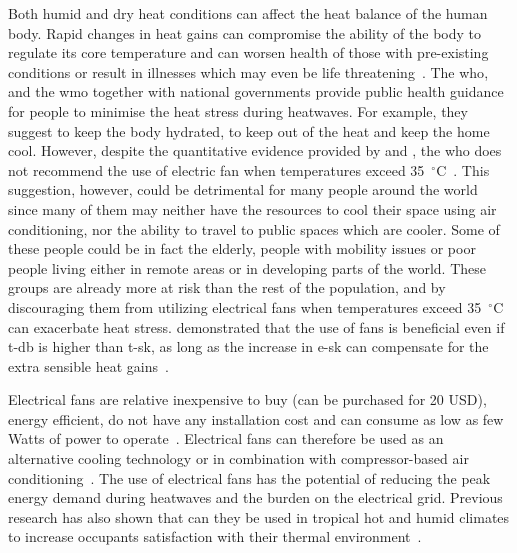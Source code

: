 Both humid and dry heat conditions can affect the heat balance of the human body.
Rapid changes in heat gains can compromise the ability of the body to regulate its core temperature and can worsen health of those with pre-existing conditions or result in illnesses which may even be life threatening~\cite{WMO2015}.
The \ac{who}, and the \ac{wmo} together with national governments provide public health guidance for people to minimise the heat stress during heatwaves.
For example, they suggest to keep the body hydrated, to keep out of the heat and keep the home cool.
However, despite the quantitative evidence provided by  and , the \ac{who} does not recommend the use of electric fan when temperatures exceed 35~$^{\circ}$C~\cite{HeatandH28:online, WMO2015}.
This suggestion, however, could be detrimental for many people around the world since many of them may neither have the resources to cool their space using air conditioning, nor the ability to travel to public spaces which are cooler.
Some of these people could be in fact the elderly, people with mobility issues or poor people living either in remote areas or in developing parts of the world.
These groups are already more at risk than the rest of the population, and by discouraging them from utilizing electrical fans when temperatures exceed 35~$^{\circ}$C can exacerbate heat stress.
 demonstrated that the use of fans is beneficial even if \ac{t-db} is higher than \ac{t-sk}, as long as the increase in \ac{e-sk} can compensate for the extra sensible heat gains~\cite{Jay2015}.

Electrical fans are relative inexpensive to buy (can be purchased for 20 USD), energy efficient, do not have any installation cost and can consume as low as few Watts of power to operate~\cite{Jay2019a, Yang2015a, Lipczynska2018a}.
Electrical fans can therefore be used as an alternative cooling technology or in combination with compressor-based air conditioning~\cite{Jay2019a, Yang2015a, Lipczynska2018a}.
The use of electrical fans has the potential of reducing the peak energy demand during heatwaves and the burden on the electrical grid.
Previous research has also shown that can they be used in tropical hot and humid climates to increase occupants satisfaction with their thermal environment~\cite{Lipczynska2018a}.

